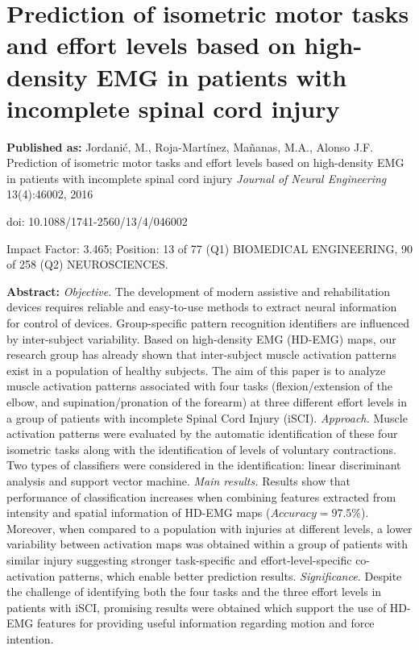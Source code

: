 \chapter[Myoelectric patterns within the group of patients with iSCI]{Prediction of isometric motor tasks and effort levels based on high-density EMG in patients with incomplete spinal cord injury}
\label{ch:p2}
\textbf{Published as:} 
Jordanić, M., Roja-Martínez,  Ma\~nanas, M.A., Alonso J.F.
Prediction of isometric motor tasks and effort levels based on high-density EMG in patients with incomplete spinal cord injury \textit{Journal of Neural Engineering} 13(4):46002, 2016

doi: 10.1088/1741-2560/13/4/046002

Impact Factor: 3.465; Position: 13 of 77 (Q1) BIOMEDICAL ENGINEERING, 90 of 258 (Q2) NEUROSCIENCES.


\textbf{Abstract:} \textit{Objective}. The development of modern assistive and rehabilitation devices requires reliable and easy-to-use methods to extract neural information for control of devices. Group-specific pattern recognition identifiers are influenced by inter-subject variability. Based on high-density EMG (HD-EMG) maps, our research group has already shown that inter-subject muscle activation patterns exist in a population of healthy subjects. The aim of this paper is to analyze muscle activation patterns associated with four tasks (flexion/extension of the elbow, and supination/pronation of the forearm) at three different effort levels in a group of patients with incomplete Spinal Cord Injury (iSCI). \textit{Approach.} Muscle activation patterns were evaluated by the automatic identification of these four isometric tasks along with the identification of levels of voluntary contractions. Two types of classifiers were considered in the identification: linear discriminant analysis and support vector machine. \textit{Main results.} Results show that performance of classification increases when combining features extracted from intensity and spatial information of HD-EMG maps ($Accuracy = 97.5\%$). Moreover, when compared to a population with injuries at different levels, a lower variability between activation maps was obtained within a group of patients with similar injury suggesting stronger task-specific and effort-level-specific co-activation patterns, which enable better prediction results. \textit{Significance.} Despite the challenge of identifying both the four tasks and the three effort levels in patients with iSCI, promising results were obtained which support the use of HD-EMG features for providing useful information regarding motion and force intention.

